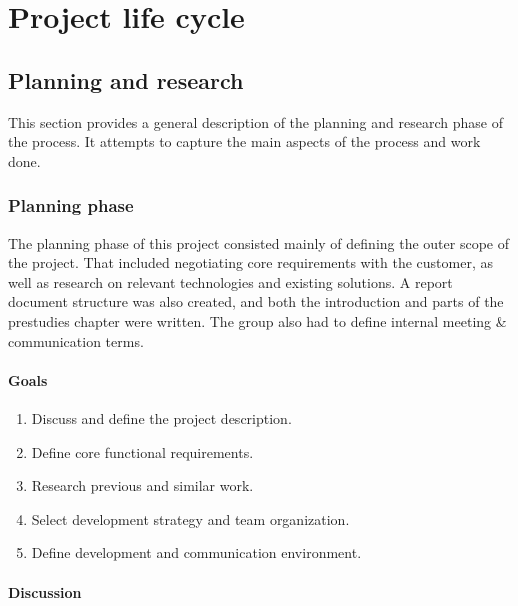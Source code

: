 
\chapter{Project life cycle}
\label{ch:project_lifecycle}

\section{Planning and research}
\label{sec:project_lifecycle-planning_and_research}

This section provides a general description of the planning and research phase of the process. It attempts to capture the main aspects of the process and work done.

\subsection{Planning phase}
\label{subsec:project_lifecycle-planning_and_research-planning_phase}

The planning phase of this project consisted mainly of defining the outer scope of the project. That included negotiating core requirements with the customer, as well as research on relevant technologies and existing solutions. A report document structure was also created, and both the introduction and parts of the prestudies chapter were written. The group also had to define internal meeting \& communication terms.

\subsubsection{Goals}
\label{subsec:project_lifecycle-planning_and_research-planning_phase-goals}

\begin{enumerate}
\item Discuss and define the project description.
\item Define core functional requirements.
\item Research previous and similar work.
\item Select development strategy and team organization.
\item Define development and communication environment.
\end{enumerate}

\subsubsection{Discussion}
\label{subsec:project_lifecycle-planning_and_research-planning_phase-discussion}

